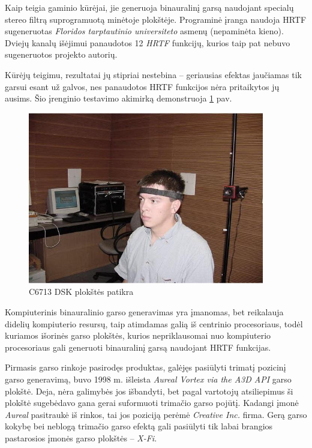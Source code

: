 \documentclass[]{vgtuef}
\begin{document}
Kaip teigia gaminio kūrėjai, jie generuoja binauralinį garsą naudojant specialų stereo filtrą suprogramuotą minėtoje plokštėje. Programinė įranga naudoja HRTF sugeneruotas \textit{Floridos tarptautinio universiteto} asmenų (nepaminėta kieno). Dviejų kanalų išėjimui panaudotos 12 \textit{HRTF} funkcijų, kurios taip pat nebuvo sugeneruotos projekto autorių. 

Kūrėjų teigimu, rezultatai jų stipriai nestebina – geriausias efektas jaučiamas tik garsui esant už galvos, nes panaudotos HRTF funkcijos nėra pritaikytos jų ausims. Šio įrenginio testavimo akimirką demonstruoja \ref{fig:C6713_dsk_board_checkout} pav.

\begin{figure}[!ht]
  \centering
  \includegraphics[width=390px]{img/c6713_patikra.jpg}
  \caption{C6713 DSK plokštės patikra}
  \label{fig:C6713_dsk_board_checkout}
\end{figure}


Kompiuterinis binauralinio garso generavimas yra įmanomas, bet reikalauja didelių kompiuterio resursų, taip atimdamas galią iš centrinio procesoriaus, todėl kuriamos išorinės garso plokštės, kurios nepriklausomai nuo kompiuterio procesoriaus gali generuoti binauralinį garsą naudojant HRTF funkcijas.

Pirmasis garso rinkoje pasirodęs produktas, galėjęs pasiūlyti trimatį pozicinį garso generavimą, buvo 1998 m. išleista \textit{Aureal Vortex via the A3D API} garso plokštė. Deja, nėra  galimybės jos išbandyti, bet pagal vartotojų atsiliepimus ši plokštė sugebėdavo gana gerai suformuoti trimačio garso pojūtį. Kadangi įmonė \textit{Aureal} pasitraukė iš rinkos, tai jos poziciją perėmė \textit{Creative Inc.} firma. Gerą garso kokybę bei neblogą trimačio garso efektą gali pasiūlyti tik labai brangios pastarosios įmonės garso plokštės – \textit{X-Fi}. 
\end{document}

